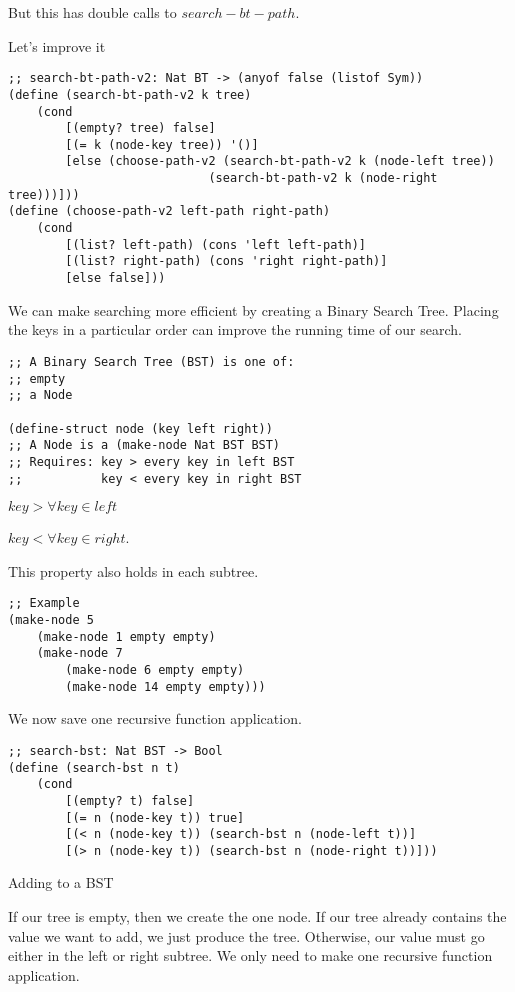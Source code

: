 \documentclass{article}
\begin{document}
But this has double calls to $search-bt-path$. 

Let's improve it

\begin{lstlisting}
;; search-bt-path-v2: Nat BT -> (anyof false (listof Sym))
(define (search-bt-path-v2 k tree)
    (cond
        [(empty? tree) false]
        [(= k (node-key tree)) '()]
        [else (choose-path-v2 (search-bt-path-v2 k (node-left tree))
                            (search-bt-path-v2 k (node-right tree)))]))
(define (choose-path-v2 left-path right-path)
    (cond
        [(list? left-path) (cons 'left left-path)]
        [(list? right-path) (cons 'right right-path)]
        [else false]))
\end{lstlisting}

We can make searching more efficient by creating a Binary Search Tree. Placing the keys in a particular order can improve the running time of our search. 

\begin{lstlisting}
;; A Binary Search Tree (BST) is one of:
;; empty
;; a Node

(define-struct node (key left right))
;; A Node is a (make-node Nat BST BST)
;; Requires: key > every key in left BST
;;           key < every key in right BST
\end{lstlisting}

$key > \forall key \in left$

$key < \forall key \in right$.

This property also holds in each subtree. 

\begin{lstlisting}
;; Example
(make-node 5
    (make-node 1 empty empty)
    (make-node 7
        (make-node 6 empty empty)
        (make-node 14 empty empty)))
\end{lstlisting}

We now save one recursive function application. 

\begin{lstlisting}
;; search-bst: Nat BST -> Bool
(define (search-bst n t)
    (cond
        [(empty? t) false]
        [(= n (node-key t)) true]
        [(< n (node-key t)) (search-bst n (node-left t))]
        [(> n (node-key t)) (search-bst n (node-right t))]))
\end{lstlisting}

Adding to a BST

If our tree is empty, then we create the one node. If our tree already contains the value we want to add, we just produce the tree. Otherwise, our value must go either in the left or right subtree. We only need to make one recursive function application. 
\end{document}

